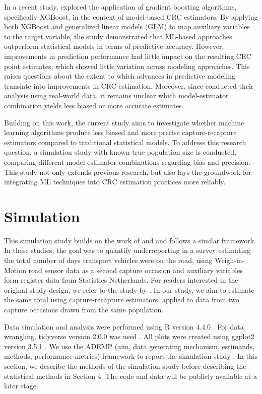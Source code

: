 \documentclass[12pt, a4paper]{article}
\begin{document}
In a recent study, \textcite{walraad2024MLCRC} explored the application of gradient boosting algorithms, specifically XGBoost, in the context of model-based CRC estimators. By applying both XGBoost and generalized linear models (GLM) to map auxiliary variables to the target variable, the study demonstrated that ML-based approaches outperform statistical models in terms of predictive accuracy. However, improvements in prediction performance had little impact on the resulting CRC point estimates, which showed little variation across modeling approaches. This raises questions about the extent to which advances in predictive modeling translate into improvements in CRC estimation. Moreover, since \textcite{walraad2024MLCRC} conducted their analysis using real-world data, it remains unclear which model-estimator combination yields less biased or more accurate estimates. \par

Building on this work, the current study aims to investigate whether machine learning algorithms produce less biased and more precise capture-recapture estimators compared to traditional statistical models. To address this research question, a simulation study with known true population size is conducted, comparing different model-estimator combinations regarding bias and precision. This study not only extends previous research, but also lays the groundwork for integrating ML techniques into CRC estimation practices more reliably.



\section{Simulation}
\noindent This simulation study builds on the work of \textcite{klingwort2019CRC} and \textcite{walraad2024MLCRC} and follows a similar framework. In these studies, the goal was to quantify underreporting in a survey estimating the total number of days transport vehicles were on the road, using Weigh-in-Motion road sensor data as a second capture occasion and auxiliary variables form register data from Statistics Netherlands. For readers interested in the original study design, we refer to the study by \textcite{klingwort2019CRC}. In our study, we aim to estimate the same total using capture-recapture estimators, applied to data from two capture occasions drawn from the same population. \par

Data simulation and analysis were performed using R version 4.4.0 \parencite{RVersion440}. For data wrangling, tidyverse version 2.0.0 was used \parencite{tidyverse}. All plots were created using ggplot2 version 3.5.1 \parencite{ggplot2}. We use the ADEMP (aim, data generating mechanism, estimands, methods, performance metrics) framework to report the simulation study \parencite{morris2019using}. In this section, we describe the methods of the simulation study before describing the statistical methods in Section 4. The code and data will be publicly available at a later stage.
\end{document}
